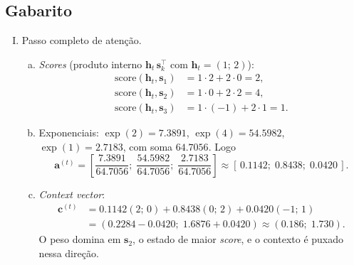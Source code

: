 \documentclass{dlproblemset}
\begin{document}
\subsection*{Gabarito}
\color{blue}
\begin{enumerate}[I)]

\item Passo completo de atenção.
\begin{enumerate}[(a)]
    \item \textit{Scores} (produto interno $\mathbf{h}_t\,\mathbf{s}_k^{\top}$ com $\mathbf{h}_t = (1;\, 2)$):
    \begin{align*}
        \text{score}(\mathbf{h}_t, \mathbf{s}_1) &= 1 \cdot 2 + 2 \cdot 0 = 2, \\
        \text{score}(\mathbf{h}_t, \mathbf{s}_2) &= 1 \cdot 0 + 2 \cdot 2 = 4, \\
        \text{score}(\mathbf{h}_t, \mathbf{s}_3) &= 1 \cdot ({-}1) + 2 \cdot 1 = 1.
    \end{align*}
    \item Exponenciais: $\exp(2) = 7.3891$, $\exp(4) = 54.5982$, $\exp(1) = 2.7183$, com
    soma $64.7056$. Logo
    \[
        \mathbf{a}^{(t)} = \left[\frac{7.3891}{64.7056};\; \frac{54.5982}{64.7056};\;
        \frac{2.7183}{64.7056}\right] \approx [\,0.1142;\; 0.8438;\; 0.0420\,].
    \]
    \item \textit{Context vector}:
    \begin{align*}
        \mathbf{c}^{(t)} &= 0.1142 (2;\, 0) + 0.8438 (0;\, 2) + 0.0420 ({-}1;\, 1) \\
                &= (0.2284 - 0.0420;\; 1.6876 + 0.0420) \approx (0.186;\; 1.730).
    \end{align*}
    O peso domina em $\mathbf{s}_2$, o estado de maior \textit{score}, e o contexto é puxado nessa direção.
\end{enumerate}


\end{enumerate}
\end{document}
